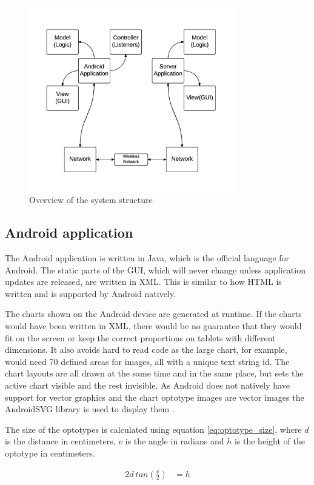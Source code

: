 \documentclass[12pt,a4paper,notitlepage]{report}
\begin{document}
\begin{figure}[ht!]
\centering
\includegraphics[width=90mm]{images/system_structure.png}
\caption{Overview of the system structure\label{system_structure}}
\end{figure}

\subsection{Android application}
The Android application is written in Java, which is the official language for Android. The static parts of the GUI, which will never change unless application updates are released, are written in XML. This is similar to how HTML is written and is supported by Android natively.

The charts shown on the Android device are generated at runtime. If the charts would have been written in XML, there would be no guarantee that they would fit on the screen or keep the correct proportions on tablets with different dimensions. It also avoids hard to read code as the large chart, for example, would need 70 defined areas for images, all with a unique text string id. The chart layouts are all drawn at the same time and in the same place, but sets the active chart visible and the rest invisible. As Android does not natively have support for vector graphics and the chart optotype images are vector images the AndroidSVG library is used to display them \cite{AndroidSVG}.

The size of the optotypes is calculated using equation \ref{eq:optotype_size}, where $d$ is the distance in centimeters, $v$ is the angle in radians and $h$ is the height of the optotype in centimeters.

\begin{equation}
	\begin{split}
  		2d\ tan(\frac{v}{2}) & = h
  	\end{split}
  	\label{eq:optotype_size}
\end{equation}
\end{document}
